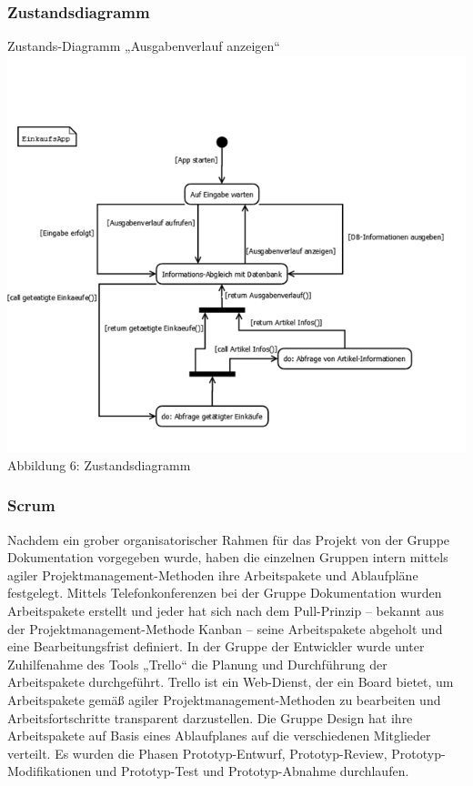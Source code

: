 \documentclass[12pt,a4paper]{article}
\begin{document}
\subsubsection*{Zustandsdiagramm}
Zustands-Diagramm „Ausgabenverlauf anzeigen“
\\
\includegraphics[scale=0.6, origin=l]{Zustandsdiagramm.png}
\\
\footnotesize Abbildung 6: Zustandsdiagramm
\normalsize
\\
\linebreak



\subsubsection{Scrum}
Nachdem ein grober organisatorischer Rahmen für das Projekt von der Gruppe Dokumentation vorgegeben wurde, haben die einzelnen Gruppen intern mittels agiler Projektmanagement-Methoden ihre Arbeitspakete und Ablaufpläne festgelegt. 
Mittels Telefonkonferenzen bei der Gruppe Dokumentation wurden Arbeitspakete erstellt und jeder hat sich nach dem Pull-Prinzip – bekannt aus der Projektmanagement-Methode Kanban – seine Arbeitspakete abgeholt und eine Bearbeitungsfrist definiert. 
In der Gruppe der Entwickler wurde unter Zuhilfenahme des Tools „Trello“ die Planung und Durchführung der Arbeitspakete durchgeführt. Trello ist ein Web-Dienst, der ein Board bietet, um Arbeitspakete gemäß agiler Projektmanagement-Methoden zu bearbeiten und Arbeitsfortschritte transparent darzustellen. 
Die Gruppe Design hat ihre Arbeitspakete auf Basis eines Ablaufplanes auf die verschiedenen Mitglieder verteilt. Es wurden die Phasen Prototyp-Entwurf, Prototyp-Review, Prototyp-Modifikationen und Prototyp-Test und Prototyp-Abnahme durchlaufen.
\newpage
\end{document}
